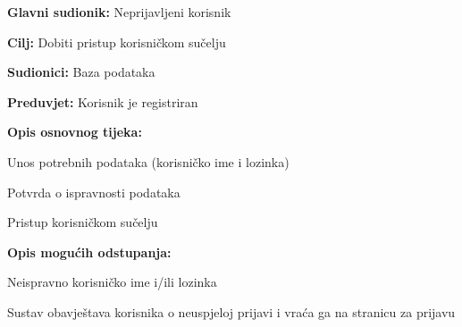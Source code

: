 					\noindent {}
					\begin{packed_item}
						
						\item \textbf{Glavni sudionik:} Neprijavljeni korisnik
						\item  \textbf{Cilj:} Dobiti pristup korisničkom sučelju
						\item  \textbf{Sudionici:} Baza podataka
						\item  \textbf{Preduvjet:} Korisnik je registriran
						\item  \textbf{Opis osnovnog tijeka:}
						
						\item[] \begin{packed_enum}
							
							\item Unos potrebnih podataka (korisničko ime i lozinka)
							\item Potvrda o ispravnosti podataka
							\item Pristup korisničkom sučelju
						\end{packed_enum}
						
						\item  \textbf{Opis mogućih odstupanja:}
						
						\item[] \begin{packed_item}
							
							\item[2.a] Neispravno korisničko ime i/ili lozinka
							\item[] \begin{packed_enum}
								
								\item Sustav obavještava korisnika o neuspjeloj prijavi i vraća ga na stranicu za prijavu
								
							\end{packed_enum}
							
						\end{packed_item}
					\end{packed_item}
				
